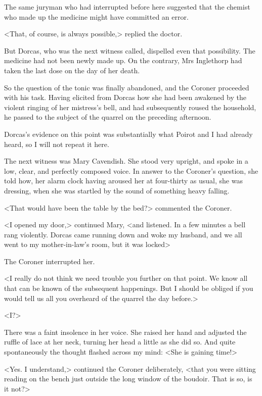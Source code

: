  The same juryman who had interrupted before here suggested that the chemist who made up the medicine might have committed an error. 

 <That, of course, is always possible,> replied the doctor. 

 But Dorcas, who was the next witness called, dispelled even that possibility. The medicine had not been newly made up. On the contrary, Mrs Inglethorp had taken the last dose on the day of her death. 

 So the question of the tonic was finally abandoned, and the Coroner proceeded with his task. Having elicited from Dorcas how she had been awakened by the violent ringing of her mistress's bell, and had subsequently roused the household, he passed to the subject of the quarrel on the preceding afternoon. 

 Dorcas's evidence on this point was substantially what Poirot and I had already heard, so I will not repeat it here. 

 The next witness was Mary Cavendish. She stood very upright, and spoke in a low, clear, and perfectly composed voice. In answer to the Coroner's question, she told how, her alarm clock having aroused her at four-thirty as usual, she was dressing, when she was startled by the sound of something heavy falling. 

 <That would have been the table by the bed?> commented the Coroner. 

 <I opened my door,> continued Mary, <and listened. In a few minutes a bell rang violently. Dorcas came running down and woke my husband, and we all went to my mother-in-law's room, but it was locked\longdash> 

 The Coroner interrupted her. 

 <I really do not think we need trouble you further on that point. We know all that can be known of the subsequent happenings. But I should be obliged if you would tell us all you overheard of the quarrel the day before.> 

 <I?> 

 There was a faint insolence in her voice. She raised her hand and adjusted the ruffle of lace at her neck, turning her head a little as she did so. And quite spontaneously the thought flashed across my mind: <She is gaining time!> 

 <Yes. I understand,> continued the Coroner deliberately, <that you were sitting reading on the bench just outside the long window of the boudoir. That is so, is it not?> 

